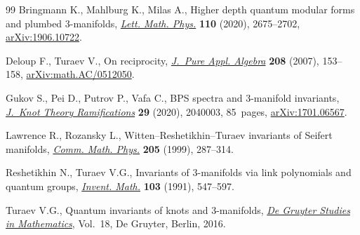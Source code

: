 \documentclass[11pt]{article}
\numberwithin{equation}{section}
\numberwithin{equation}{section}
\begin{document}
\begin{thebibliography}{99}
Bringmann K., Mahlburg K., Milas A., Higher depth quantum modular forms and
 plumbed 3-manifolds, \href{https://doi.org/10.1007/s11005-020-01310-z}{\textit{Lett. Math. Phys.}} \textbf{110} (2020),
 2675--2702, \href{https://arxiv.org/abs/1906.10722}{arXiv:1906.10722}.

Deloup F., Turaev V., On reciprocity, \href{https://doi.org/10.1016/j.jpaa.2005.12.008}{\textit{J.~Pure Appl. Algebra}}
 \textbf{208} (2007), 153--158, \href{https://arxiv.org/abs/math.AC/0512050}{arXiv:math.AC/0512050}.

Gukov S., Pei D., Putrov P., Vafa C., B{PS} spectra and 3-manifold invariants,
 \href{https://doi.org/10.1142/S0218216520400039}{\textit{J.~Knot Theory Ramifications}} \textbf{29} (2020), 2040003, 85~pages,
 \href{https://arxiv.org/abs/1701.06567}{arXiv:1701.06567}.

Lawrence R., Rozansky L., Witten--{R}eshetikhin--{T}uraev invariants of
 {S}eifert manifolds, \href{https://doi.org/10.1007/s002200050678}{\textit{Comm. Math. Phys.}} \textbf{205} (1999),
 287--314.

Reshetikhin N., Turaev V.G., Invariants of {$3$}-manifolds via link polynomials
 and quantum groups, \href{https://doi.org/10.1007/BF01239527}{\textit{Invent. Math.}} \textbf{103} (1991), 547--597.

Turaev V.G., Quantum invariants of knots and 3-manifolds, \href{https://doi.org/10.1515/9783110435221}{\textit{De Gruyter
 Studies in Mathematics}}, Vol.~18, De Gruyter, Berlin, 2016.

\end{thebibliography}
\end{document}
